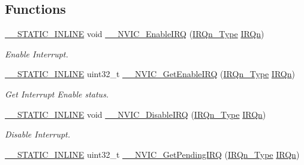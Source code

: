 \subsection*{Functions}
\begin{DoxyCompactItemize}
\item 
\mbox{\hyperlink{cmsis__iccarm_8h_aba87361bfad2ae52cfe2f40c1a1dbf9c}{\+\_\+\+\_\+\+S\+T\+A\+T\+I\+C\+\_\+\+I\+N\+L\+I\+NE}} void \mbox{\hyperlink{group___c_m_s_i_s___core___n_v_i_c_functions_ga71227e1376cde11eda03fcb62f1b33ea}{\+\_\+\+\_\+\+N\+V\+I\+C\+\_\+\+Enable\+I\+RQ}} (\mbox{\hyperlink{group___interrupt__vector__numbers_gac3af4a32370fb28c4ade8bf2add80251}{I\+R\+Qn\+\_\+\+Type}} \mbox{\hyperlink{group___interrupt__vector__numbers_ga666eb0caeb12ec0e281415592ae89083}{I\+R\+Qn}})
\begin{DoxyCompactList}\small\item\em Enable Interrupt. \end{DoxyCompactList}\item 
\mbox{\hyperlink{cmsis__iccarm_8h_aba87361bfad2ae52cfe2f40c1a1dbf9c}{\+\_\+\+\_\+\+S\+T\+A\+T\+I\+C\+\_\+\+I\+N\+L\+I\+NE}} uint32\+\_\+t \mbox{\hyperlink{group___c_m_s_i_s___core___n_v_i_c_functions_gaaeb5e7cc0eaad4e2817272e7bf742083}{\+\_\+\+\_\+\+N\+V\+I\+C\+\_\+\+Get\+Enable\+I\+RQ}} (\mbox{\hyperlink{group___interrupt__vector__numbers_gac3af4a32370fb28c4ade8bf2add80251}{I\+R\+Qn\+\_\+\+Type}} \mbox{\hyperlink{group___interrupt__vector__numbers_ga666eb0caeb12ec0e281415592ae89083}{I\+R\+Qn}})
\begin{DoxyCompactList}\small\item\em Get Interrupt Enable status. \end{DoxyCompactList}\item 
\mbox{\hyperlink{cmsis__iccarm_8h_aba87361bfad2ae52cfe2f40c1a1dbf9c}{\+\_\+\+\_\+\+S\+T\+A\+T\+I\+C\+\_\+\+I\+N\+L\+I\+NE}} void \mbox{\hyperlink{group___c_m_s_i_s___core___n_v_i_c_functions_gae016e4c1986312044ee768806537d52f}{\+\_\+\+\_\+\+N\+V\+I\+C\+\_\+\+Disable\+I\+RQ}} (\mbox{\hyperlink{group___interrupt__vector__numbers_gac3af4a32370fb28c4ade8bf2add80251}{I\+R\+Qn\+\_\+\+Type}} \mbox{\hyperlink{group___interrupt__vector__numbers_ga666eb0caeb12ec0e281415592ae89083}{I\+R\+Qn}})
\begin{DoxyCompactList}\small\item\em Disable Interrupt. \end{DoxyCompactList}\item 
\mbox{\hyperlink{cmsis__iccarm_8h_aba87361bfad2ae52cfe2f40c1a1dbf9c}{\+\_\+\+\_\+\+S\+T\+A\+T\+I\+C\+\_\+\+I\+N\+L\+I\+NE}} uint32\+\_\+t \mbox{\hyperlink{group___c_m_s_i_s___core___n_v_i_c_functions_ga5a92ca5fa801ad7adb92be7257ab9694}{\+\_\+\+\_\+\+N\+V\+I\+C\+\_\+\+Get\+Pending\+I\+RQ}} (\mbox{\hyperlink{group___interrupt__vector__numbers_gac3af4a32370fb28c4ade8bf2add80251}{I\+R\+Qn\+\_\+\+Type}} \mbox{\hyperlink{group___interrupt__vector__numbers_ga666eb0caeb12ec0e281415592ae89083}{I\+R\+Qn}})

\end{DoxyCompactItemize}
